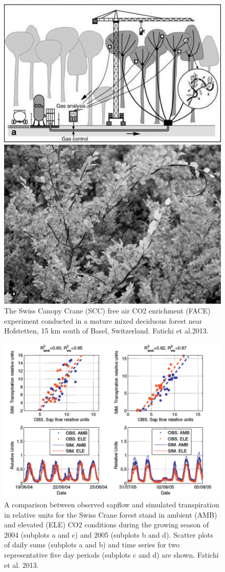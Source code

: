 \documentclass[
  12pt,
  oneside]{book}
\begin{document}
\begin{figure}

{\centering \includegraphics[width=0.8\linewidth]{figures/chap5/f510_face} 

}

\caption{The Swiss Canopy Crane (SCC) free air CO2 enrichment (FACE) experiment  conducted in a mature mixed deciduous forest near Hofstetten, 15 km south of Basel, Switzerland. Fatichi et al.2013. }\label{fig:f510}
\end{figure}
\begin{figure}

{\centering \includegraphics[width=0.8\linewidth]{figures/chap5/f511_fatichi_sf} 

}

\caption{A comparison between observed sapflow and simulated transpiration in relative units for the Swiss Crane forest stand in ambient (AMB) and elevated (ELE) CO2 conditions during the growing season of 2004 (subplots a and c) and 2005 (subplots b and d). Scatter plots of daily sums (subplots a and b) and time series for two representative five day periods (subplots c and d) are shown. Fatichi et al. 2013.}\label{fig:f511}
\end{figure}
\end{document}
